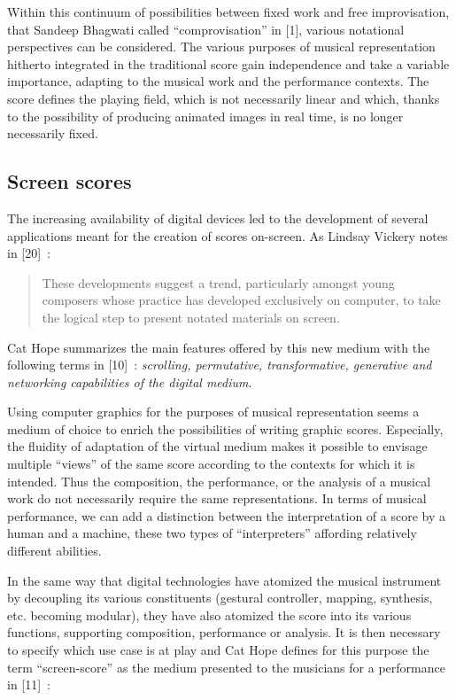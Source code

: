 Within this continuum of possibilities between fixed work and free improvisation, that Sandeep Bhagwati called “comprovisation” in [1], various notational perspectives can be considered. The various purposes of musical representation hitherto integrated in the traditional score gain independence and take a variable importance, adapting to the musical work and the performance contexts. The score defines the playing field, which is not necessarily linear and which, thanks to the possibility of producing animated images in real time, is no longer necessarily fixed.

\subsection{Screen scores}
The increasing availability of digital devices led to the development of several applications meant for the creation of scores on-screen. As Lindsay Vickery notes in [20] :

\begin{quotation}
These developments suggest a trend, particularly amongst young composers whose practice has developed exclusively on computer, to take the logical step to present notated materials on screen.
\end{quotation}

Cat Hope summarizes the main features offered by this new medium with the following terms in [10] : \textit{scrolling, permutative, transformative, generative and networking capabilities of the digital medium}.

Using computer graphics for the purposes of musical representation seems a medium of choice to enrich the possibilities of writing graphic scores. Especially, the fluidity of adaptation of the virtual medium makes it possible to envisage multiple “views” of the same score according to the contexts for which it is intended. Thus the composition, the performance, or the analysis of a musical work do not necessarily require the same representations. In terms of musical performance, we can add a distinction between the interpretation of a score by a human and a machine, these two types of “interpreters” affording relatively different abilities.

In the same way that digital technologies have atomized the musical instrument by decoupling its various constituents (gestural controller, mapping, synthesis, etc. becoming modular), they have also atomized the score into its various functions, supporting composition, performance or analysis. It is then necessary to specify which use case is at play and Cat Hope defines for this purpose the term “screen-score” as the medium presented to the musicians for a performance in [11] :

